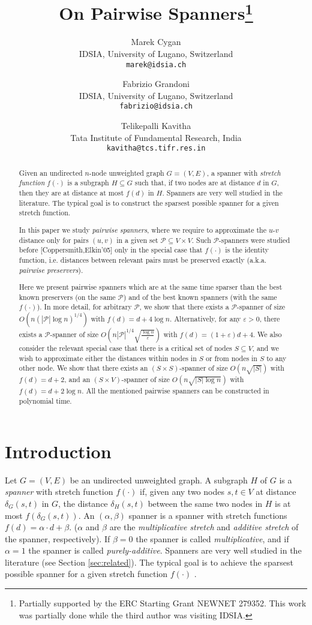 \documentclass[a4paper,11pt]{article}
\title{On Pairwise Spanners\footnote{Partially supported by the ERC Starting Grant NEWNET 279352. This work was partially done while the third author was visiting IDSIA.}}
\author{
 Marek Cygan \\
  IDSIA, University of Lugano, Switzerland \\
\small  \texttt{marek@idsia.ch}  \\
\and
Fabrizio Grandoni \\
  IDSIA, University of Lugano, Switzerland \\
\small   \texttt{fabrizio@idsia.ch}  \\
\and
Telikepalli Kavitha \\
Tata Institute of Fundamental Research, India \\
\small \texttt{kavitha@tcs.tifr.res.in}
}
\theoremstyle{definition}
\newcommand{\cP}{\mathcal{P}}
\newcommand{\eps}{\varepsilon}
\begin{document}
\maketitle

\begin{abstract}
Given an undirected $n$-node unweighted graph $G = (V, E)$, a spanner with \emph{stretch function} $f(\cdot)$ is a subgraph $H\subseteq G$ such that, if two nodes are at distance $d$ in $G$, then they are at distance at most $f(d)$ in $H$. Spanners are very well studied in the literature. The typical goal is to construct the sparsest possible spanner for a given stretch function. 

In this paper we study \emph{pairwise spanners}, where we require to approximate the $u$-$v$ distance 
only for pairs $(u,v)$ in a given set $\cP \subseteq V\times V$.
Such $\cP$-spanners were studied before [Coppersmith,Elkin'05] only in the special case that $f(\cdot)$ is the identity function, i.e. distances between relevant pairs must be preserved exactly (a.k.a. {\em pairwise preservers}). 

Here we present pairwise spanners which are at the same time sparser than the best known preservers (on the same $\cP$) and of the best known spanners (with the same $f(\cdot)$).
In more detail, for arbitrary $\cP$, we show that there exists a $\mathcal{P}$-spanner of size $O(n(|\cP|\log n)^{1/4})$ with $f(d)=d+4\log n$. Alternatively, for any $\eps>0$, there exists a $\cP$-spanner of size $O(n|\cP|^{1/4}\sqrt{\frac{\log n}{\eps}})$ with $f(d)=(1+\eps)d+4$. We also consider the relevant special case that there is a critical set of nodes $S\subseteq V$, and we wish to approximate either the distances within nodes in $S$ or from nodes in $S$ to any other node. We show that there exists an $(S\times S)$-spanner of size $O(n\sqrt{|S|})$ with $f(d)=d+2$, and an $(S\times V)$-spanner of size $O(n\sqrt{|S|\log n})$ with $f(d)=d+2\log n$. All the mentioned pairwise spanners can be constructed in polynomial time.
\end{abstract}





\section{Introduction}
\label{intro}

Let $G = (V,E)$ be an undirected unweighted graph. A subgraph $H$ of $G$ is a \emph{spanner} with stretch function $f(\cdot)$ if, given any two nodes $s, t \in V$ at distance $\delta_G(s,t)$ in $G$, the distance $\delta_H(s,t)$ between the same two nodes in $H$ is at most $f(\delta_G(s,t))$. An $(\alpha,\beta)$ spanner is a spanner with stretch functions $f(d)=\alpha\cdot d+\beta$. ($\alpha$ and $\beta$ are the \emph{multiplicative stretch} and \emph{additive stretch} of the spanner, respectively). If $\beta=0$ the spanner is called \emph{multiplicative}, and if $\alpha=1$ the spanner is called \emph{purely-additive}. 
Spanners are very well studied in the literature (see Section \ref{sec:related}). The typical goal is to achieve the sparsest possible spanner for a given stretch function $f(\cdot)$ \cite{BKMP05,BS03,DHZ97,E05,EP04,HZ96,PS89,RZ04,RMZ05,TZ06}.
\end{document}
